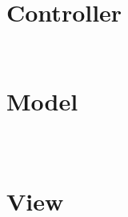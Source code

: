 \begin{lstlisting}[language=PHP]

\end{lstlisting}



\begin{lstlisting}[language=PHP]

\end{lstlisting}


\chapter{Controller}

\begin{lstlisting}[language=PHP]

\end{lstlisting}



\begin{lstlisting}[language=PHP]

\end{lstlisting}


\chapter{Model}

\begin{lstlisting}[language=PHP]

\end{lstlisting}



\begin{lstlisting}[language=PHP]

\end{lstlisting}



\begin{lstlisting}[language=PHP]

\end{lstlisting}

\chapter{View}

\begin{lstlisting}[language=PHP]

\end{lstlisting}




\begin{lstlisting}[language=PHP]

\end{lstlisting}


